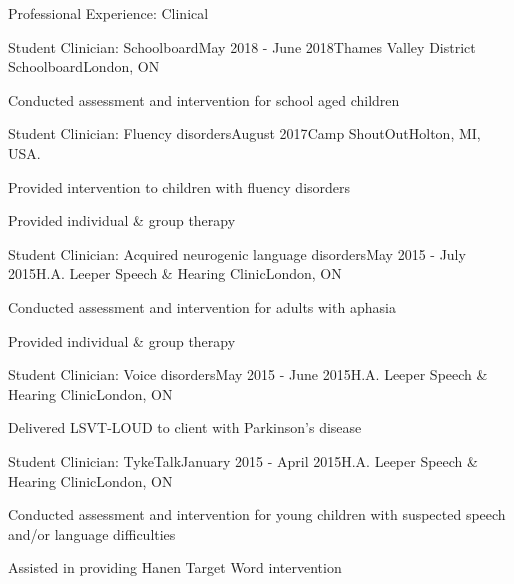 \documentclass{resume} %
\begin{document}
\begin{rSection}{Professional Experience: Clinical}

	\begin{rSubsection}{Student Clinician: Schoolboard}{May 2018 - June 2018}{Thames Valley District Schoolboard}{London, ON}
	\item Conducted assessment and intervention for school aged children
	\end{rSubsection}
	
	\begin{rSubsection}{Student Clinician: Fluency disorders}{August 2017}{Camp ShoutOut}{Holton, MI, USA.}
	\item Provided intervention to children with fluency disorders
	\item Provided individual \& group therapy
	\end{rSubsection}
	
	
	\begin{rSubsection}{Student Clinician: Acquired neurogenic language disorders}{May 2015 - July 2015}{H.A. Leeper Speech \& Hearing Clinic}{London, ON}
	\item Conducted assessment and intervention for adults with aphasia
	\item Provided individual \& group therapy
	\end{rSubsection}
	
	
	\begin{rSubsection}{Student Clinician: Voice disorders}{May 2015 - June 2015}{H.A. Leeper Speech \& Hearing Clinic}{London, ON}
	\item Delivered LSVT-LOUD to client with Parkinson's disease
	\end{rSubsection}
	
	
	\begin{rSubsection}{Student Clinician: TykeTalk}{January 2015 - April 2015}{H.A. Leeper Speech \& Hearing Clinic}{London, ON}
	\item Conducted assessment and intervention for young children with suspected speech and/or language difficulties
	\item Assisted in providing Hanen Target Word intervention
	\end{rSubsection}
\end{rSection}
\end{document}
